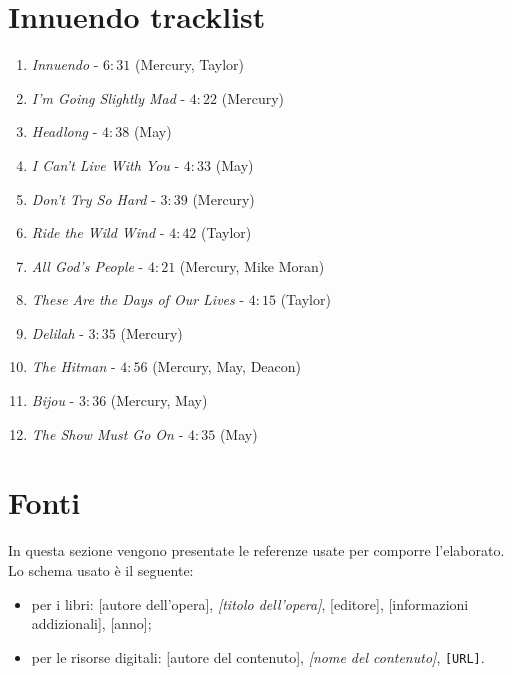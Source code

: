 \documentclass[12pt]{article}
\begin{document}
\section{Innuendo tracklist}

\begin{enumerate}[noitemsep]
 \item \emph{Innuendo} - \(6:31\) (Mercury, Taylor)
 \item \emph{I'm Going Slightly Mad} - \(4:22\) (Mercury)
 \item \emph{Headlong} - \(4:38\) (May)
 \item \emph{I Can't Live With You} - \(4:33\) (May)
 \item \emph{Don't Try So Hard} - \(3:39\) (Mercury)
 \item \emph{Ride the Wild Wind} - \(4:42\) (Taylor)
 \item \emph{All God's People} - \(4:21\) (Mercury, Mike Moran)
 \item \emph{These Are the Days of Our Lives} - \(4:15\) (Taylor)
 \item \emph{Delilah} - \(3:35\) (Mercury)
 \item \emph{The Hitman} - \(4:56\) (Mercury, May, Deacon)
 \item \emph{Bijou} - \(3:36\) (Mercury, May)
 \item \emph{The Show Must Go On} - \(4:35\) (May)
\end{enumerate}

\newpage

\section{Fonti}
In questa sezione vengono presentate le referenze usate per comporre l'elaborato. Lo schema usato è il seguente:

\begin{itemize}
 \item per i libri: [autore dell'opera], \textit{[titolo dell'opera]}, [editore], [informazioni addizionali], [anno];
 \item per le risorse digitali: [autore del contenuto], \textit{[nome del contenuto]}, \texttt{[URL]}.
\end{itemize}
\end{document}
